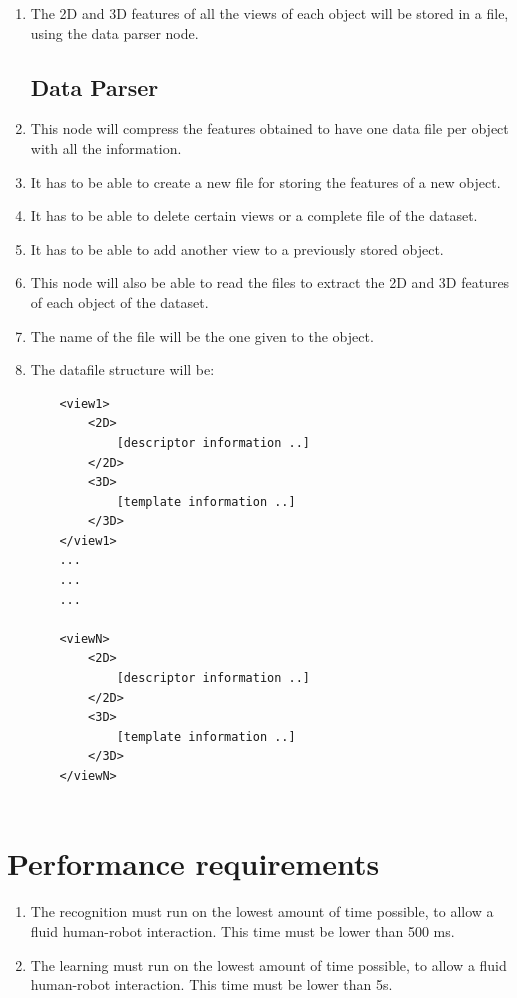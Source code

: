 \documentclass{article}
\makeatletter
\def\threedigits#1{\expandafter\@threedigits\csname c@#1\endcsname}
\def\@threedigits#1{%
  \ifnum#1<100 0\fi
  \ifnum#1<10 0\fi
  \number#1}
\makeatother
\begin{document}
\begin{enumerate}[label=\textbf{FR\threedigits*}, leftmargin=2cm]
\item The 2D and 3D features of all the views of each object will be stored in a file, using the data parser node.  

\subsection{Data Parser}
\item This node will compress the features obtained to have one data file per object with all the information.
 
\item It has to be able to create a new file for storing the features of a new object. 
\item It has to be able to delete certain views or a complete file of the dataset. 
\item It has to be able to add another view to a previously stored object. 

\item This node will also be able to read the files to extract the 2D and 3D features of each object of the dataset. 

\item The name of the file will be the one given to the object. 

\item The datafile structure will be: \\
		\begin{lstlisting}
	<view1>
		<2D>
			[descriptor information ..]
		</2D>
		<3D>
			[template information ..]
		</3D>
	</view1>	
	...
	...
	...		
			
	<viewN>
		<2D>
			[descriptor information ..]
		</2D>
		<3D>
			[template information ..]
		</3D>
	</viewN>	
		
		\end{lstlisting}
	


\end{enumerate}





\section{Performance requirements}

\begin{enumerate}[label=\textbf{PR\threedigits*}]
\item The recognition must run on the lowest amount of time possible, to allow a fluid human-robot interaction. This time must be lower than 500 ms. 
\item The learning must run on the lowest amount of time possible, to allow a fluid human-robot interaction. This time must be lower than 5s. 
\end{enumerate}
\end{document}
